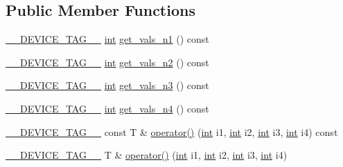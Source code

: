 \subsection*{Public Member Functions}
\begin{DoxyCompactItemize}
\item 
\hyperlink{scalar__traits_8h_a2396f3e69fc9792ad01b8b14a1a425e3}{\-\_\-\-\_\-\-D\-E\-V\-I\-C\-E\-\_\-\-T\-A\-G\-\_\-\-\_\-} \hyperlink{classint}{int} \hyperlink{structutils_1_1vals__table__4d_ab69292eca21719512bcc62d2326452b5}{get\-\_\-vals\-\_\-n1} () const 
\item 
\hyperlink{scalar__traits_8h_a2396f3e69fc9792ad01b8b14a1a425e3}{\-\_\-\-\_\-\-D\-E\-V\-I\-C\-E\-\_\-\-T\-A\-G\-\_\-\-\_\-} \hyperlink{classint}{int} \hyperlink{structutils_1_1vals__table__4d_a9006537d5fb565e1c8434c2ec08ef721}{get\-\_\-vals\-\_\-n2} () const 
\item 
\hyperlink{scalar__traits_8h_a2396f3e69fc9792ad01b8b14a1a425e3}{\-\_\-\-\_\-\-D\-E\-V\-I\-C\-E\-\_\-\-T\-A\-G\-\_\-\-\_\-} \hyperlink{classint}{int} \hyperlink{structutils_1_1vals__table__4d_a8af528d43a35cfa5e781400e46b90feb}{get\-\_\-vals\-\_\-n3} () const 
\item 
\hyperlink{scalar__traits_8h_a2396f3e69fc9792ad01b8b14a1a425e3}{\-\_\-\-\_\-\-D\-E\-V\-I\-C\-E\-\_\-\-T\-A\-G\-\_\-\-\_\-} \hyperlink{classint}{int} \hyperlink{structutils_1_1vals__table__4d_ae791376dc95bc14144e675657acb59e4}{get\-\_\-vals\-\_\-n4} () const 
\item 
\hyperlink{scalar__traits_8h_a2396f3e69fc9792ad01b8b14a1a425e3}{\-\_\-\-\_\-\-D\-E\-V\-I\-C\-E\-\_\-\-T\-A\-G\-\_\-\-\_\-} const T \& \hyperlink{structutils_1_1vals__table__4d_af04e131ea07b613a1cae33d780ade653}{operator()} (\hyperlink{classint}{int} i1, \hyperlink{classint}{int} i2, \hyperlink{classint}{int} i3, \hyperlink{classint}{int} i4) const 
\item 
\hyperlink{scalar__traits_8h_a2396f3e69fc9792ad01b8b14a1a425e3}{\-\_\-\-\_\-\-D\-E\-V\-I\-C\-E\-\_\-\-T\-A\-G\-\_\-\-\_\-} T \& \hyperlink{structutils_1_1vals__table__4d_a052db92b28c7b0e3965129ad6cd7c8fe}{operator()} (\hyperlink{classint}{int} i1, \hyperlink{classint}{int} i2, \hyperlink{classint}{int} i3, \hyperlink{classint}{int} i4)
\end{DoxyCompactItemize}

